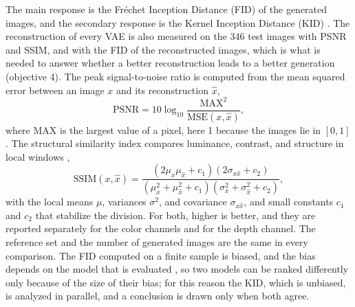 The main response is the Fr\'echet Inception Distance (FID) of the generated images, and the secondary response is the Kernel Inception Distance (KID) \cite{Heusel2017,Binkowski2018}. The reconstruction of every VAE is also measured on the 346 test images with PSNR and SSIM, and with the FID of the reconstructed images, which is what is needed to answer whether a better reconstruction leads to a better generation (objective 4). The peak signal-to-noise ratio is computed from the mean squared error between an image $x$ and its reconstruction $\hat{x}$,
\begin{equation}
\mathrm{PSNR}=10\log_{10}\frac{\mathrm{MAX}^{2}}{\mathrm{MSE}(x,\hat{x})},
\end{equation}
where $\mathrm{MAX}$ is the largest value of a pixel, here 1 because the images lie in $[0,1]$. The structural similarity index compares luminance, contrast, and structure in local windows \cite{Wang2004},
\begin{equation}
\mathrm{SSIM}(x,\hat{x})=\frac{(2\mu_x\mu_{\hat{x}}+c_1)(2\sigma_{x\hat{x}}+c_2)}{(\mu_x^{2}+\mu_{\hat{x}}^{2}+c_1)(\sigma_x^{2}+\sigma_{\hat{x}}^{2}+c_2)},
\end{equation}
with the local means $\mu$, variances $\sigma^{2}$, and covariance $\sigma_{x\hat{x}}$, and small constants $c_1$ and $c_2$ that stabilize the division. For both, higher is better, and they are reported separately for the color channels and for the depth channel. The reference set and the number of generated images are the same in every comparison. The FID computed on a finite sample is biased, and the bias depends on the model that is evaluated \cite{Chong2020}, so two models can be ranked differently only because of the size of their bias; for this reason the KID, which is unbiased, is analyzed in parallel, and a conclusion is drawn only when both agree.

